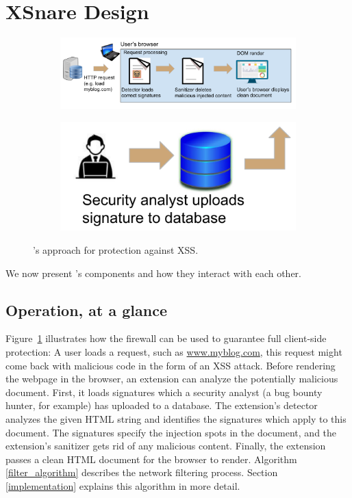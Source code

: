 \section{XSnare Design} \label{xsnare_design}

 \begin{figure}[h]
	\begin{subfigure}[b]{1.0\textwidth}
		\centering
		\includegraphics[scale=0.55]{img/xsnare_top.pdf}
		
	\end{subfigure}
	\hfill
	\begin{subfigure}[b]{0.3\textwidth}
		\includegraphics[scale=0.55]{img/xsnare_bot.pdf}
		
	\end{subfigure}
	\caption{\sys's approach for protection against XSS.}
	\label{fig:xsnare}
\end{figure}

We now present \sys's components and how they interact with each other.

\subsection{Operation, at a glance} \label{operation}
  Figure~\ref{fig:xsnare} illustrates how the firewall can be used to guarantee full client-side protection: A user loads a request, such as \url{www.myblog.com}, this request might come back with malicious code in the form of an XSS attack. Before rendering the webpage in the browser, an extension can analyze the potentially malicious document. First, it loads signatures which a security analyst (a bug bounty hunter, for example) has uploaded to a database. The extension's detector analyzes the given HTML string and identifies the signatures which apply to this document. The signatures specify the injection spots in the document, and the extension's sanitizer gets rid of any malicious content. Finally, the extension passes a clean HTML document for the browser to render. Algorithm \ref{filter_algorithm} describes the network filtering process. Section \ref{implementation} explains this algorithm in more detail.
 



